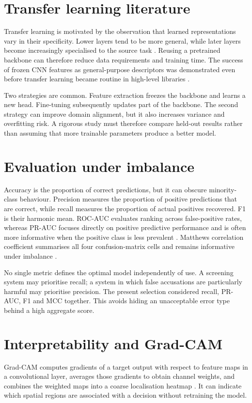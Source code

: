 \section{Transfer learning literature}
Transfer learning is motivated by the observation that learned representations vary in their specificity. Lower layers tend to be more general, while later layers become increasingly specialised to the source task \citep{yosinski2014transferable}. Reusing a pretrained backbone can therefore reduce data requirements and training time. The success of frozen CNN features as general-purpose descriptors was demonstrated even before transfer learning became routine in high-level libraries \citep{sharif2014cnn}.

Two strategies are common. Feature extraction freezes the backbone and learns a new head. Fine-tuning subsequently updates part of the backbone. The second strategy can improve domain alignment, but it also increases variance and overfitting risk. A rigorous study must therefore compare held-out results rather than assuming that more trainable parameters produce a better model.

\section{Evaluation under imbalance}
Accuracy is the proportion of correct predictions, but it can obscure minority-class behaviour. Precision measures the proportion of positive predictions that are correct, while recall measures the proportion of actual positives recovered. F1 is their harmonic mean. ROC-AUC evaluates ranking across false-positive rates, whereas PR-AUC focuses directly on positive predictive performance and is often more informative when the positive class is less prevalent \citep{davis2006relationship}. Matthews correlation coefficient summarises all four confusion-matrix cells and remains informative under imbalance \citep{matthews1975comparison}.

No single metric defines the optimal model independently of use. A screening system may prioritise recall; a system in which false accusations are particularly harmful may prioritise precision. The present selection considered recall, PR-AUC, F1 and MCC together. This avoids hiding an unacceptable error type behind a high aggregate score.

\section{Interpretability and Grad-CAM}
Grad-CAM computes gradients of a target output with respect to feature maps in a convolutional layer, averages those gradients to obtain channel weights, and combines the weighted maps into a coarse localisation heatmap \citep{selvaraju2017gradcam}. It can indicate which spatial regions are associated with a decision without retraining the model.

